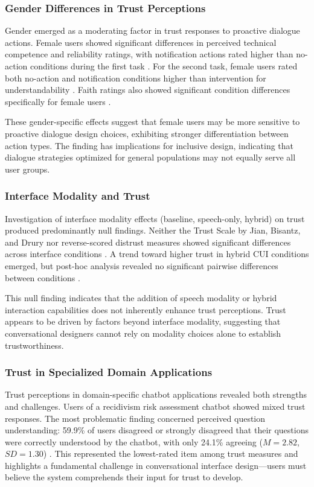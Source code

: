 \documentclass[manuscript,anonymous,sigconf]{acmart}
\begin{document}
\subsubsection{Gender Differences in Trust Perceptions}

Gender emerged as a moderating factor in trust responses to proactive dialogue actions. Female users showed significant differences in perceived technical competence and reliability ratings, with notification actions rated higher than no-action conditions during the first task \cite{A16}. For the second task, female users rated both no-action and notification conditions higher than intervention for understandability \cite{A16}. Faith ratings also showed significant condition differences specifically for female users \cite{A16}.

These gender-specific effects suggest that female users may be more sensitive to proactive dialogue design choices, exhibiting stronger differentiation between action types. The finding has implications for inclusive design, indicating that dialogue strategies optimized for general populations may not equally serve all user groups.

\subsubsection{Interface Modality and Trust}

Investigation of interface modality effects (baseline, speech-only, hybrid) on trust produced predominantly null findings. Neither the Trust Scale by Jian, Bisantz, and Drury nor reverse-scored distrust measures showed significant differences across interface conditions \cite{A15}. A trend toward higher trust in hybrid CUI conditions emerged, but post-hoc analysis revealed no significant pairwise differences between conditions \cite{A15}.

This null finding indicates that the addition of speech modality or hybrid interaction capabilities does not inherently enhance trust perceptions. Trust appears to be driven by factors beyond interface modality, suggesting that conversational designers cannot rely on modality choices alone to establish trustworthiness.

\subsubsection{Trust in Specialized Domain Applications}

Trust perceptions in domain-specific chatbot applications revealed both strengths and challenges. Users of a recidivism risk assessment chatbot showed mixed trust responses. The most problematic finding concerned perceived question understanding: 59.9\% of users disagreed or strongly disagreed that their questions were correctly understood by the chatbot, with only 24.1\% agreeing ($M = 2.82$, $SD = 1.30$) \cite{A54}. This represented the lowest-rated item among trust measures and highlights a fundamental challenge in conversational interface design---users must believe the system comprehends their input for trust to develop.
\end{document}
